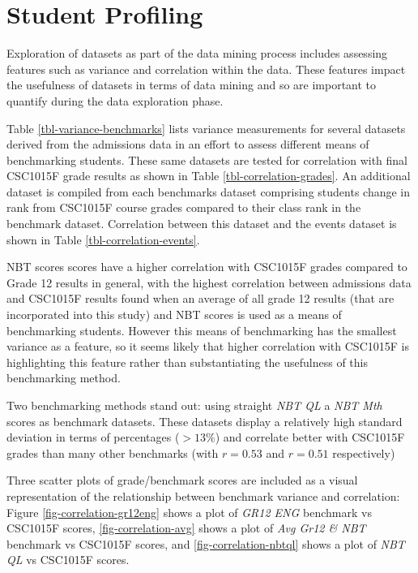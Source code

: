 

\section{Student Profiling}
Exploration of datasets as part of the data mining process includes assessing features such as variance and correlation within the data. These features impact the usefulness of datasets in terms of data mining and so are important to quantify during the data exploration phase.

Table \ref{tbl-variance-benchmarks} lists variance measurements for several datasets derived from the admissions data in an effort to assess different means of benchmarking students. These same datasets are tested for correlation with final CSC1015F grade results as shown in Table \ref{tbl-correlation-grades}. An additional dataset is compiled from each benchmarks dataset comprising students change in rank from CSC1015F course grades compared to their class rank in the benchmark dataset. Correlation between this dataset and the events dataset is shown in Table \ref{tbl-correlation-events}.





NBT scores scores have a higher correlation with CSC1015F grades compared to Grade 12 results in general, with the highest correlation between admissions data and CSC1015F results found when an average of all grade 12 results (that are incorporated into this study) and NBT scores is used as a means of benchmarking students. However this means of benchmarking has the smallest variance as a feature, so it seems likely that higher correlation with CSC1015F is highlighting this feature rather than substantiating the usefulness of this benchmarking method.

Two benchmarking methods stand out: using straight \textit{NBT QL} a \textit{NBT Mth} scores as benchmark datasets. These datasets display a relatively high standard deviation in terms of percentages ($> 13\%$) and correlate better with CSC1015F grades than many other benchmarks (with $r = 0.53$ and $r = 0.51$ respectively)

Three scatter plots of grade/benchmark scores are included as a visual representation of the relationship between benchmark variance and correlation: Figure \ref{fig-correlation-gr12eng} shows a plot of \textit{GR12 ENG} benchmark vs CSC1015F scores, \ref{fig-correlation-avg} shows a plot of \textit{Avg Gr12 \& NBT} benchmark vs CSC1015F scores, and \ref{fig-correlation-nbtql} shows a plot of \textit{NBT QL} vs CSC1015F scores.

